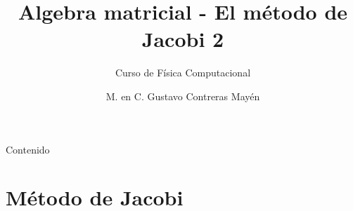


\normalfont
\usepackage{ccfonts}%
\usepackage[T1]{fontenc}%
\renewcommand{\rmdefault}{cmr}%
\linespread{1.3}
\title{Algebra matricial - El método de Jacobi 2}
\subtitle{Curso de Física Computacional}
\author[]{M. en C. Gustavo Contreras Mayén}
\newcommand{\seti}{\setcounter{saveenumi}{\value{enumi}}}
\newcommand{\conti}{\setcounter{enumi}{\value{saveenumi}}}


\newcommand{\localtextbulletone}{\textcolor{gray}{\raisebox{.45ex}{\rule{.6ex}{.6ex}}}}
\maketitle
\fontsize{14}{14}\selectfont
{}
\begin{frame}{Contenido}
\tableofcontents[pausesections]
\end{frame}
\section{Método de Jacobi}
